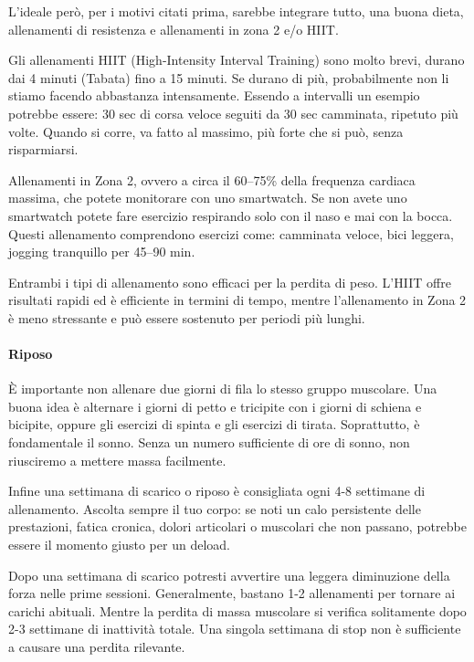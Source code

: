 \documentclass[12pt]{book} %
\begin{document}
L'ideale però, per i motivi citati prima, sarebbe integrare tutto, una buona dieta, allenamenti di resistenza e allenamenti in zona 2 e/o HIIT.

Gli allenamenti HIIT (High-Intensity Interval Training) sono molto brevi, durano dai 4 minuti (Tabata) fino a 15 minuti. Se durano di più, probabilmente non li stiamo facendo abbastanza intensamente.
Essendo a intervalli un esempio potrebbe essere: 30 sec di corsa veloce seguiti da 30 sec camminata, ripetuto più volte. Quando si corre, va fatto al massimo, più forte che si può, senza risparmiarsi.

Allenamenti in Zona 2, ovvero a circa il 60–75\% della frequenza cardiaca massima, che potete monitorare con uno smartwatch. Se non avete uno smartwatch potete fare esercizio respirando solo con il naso e mai con la bocca. Questi allenamento comprendono esercizi come: camminata veloce, bici leggera, jogging tranquillo per 45–90 min.

Entrambi i tipi di allenamento sono efficaci per la perdita di peso. L'HIIT offre risultati rapidi ed è efficiente in termini di tempo, mentre l'allenamento in Zona 2 è meno stressante e può essere sostenuto per periodi più lunghi.

\paragraph{Riposo}
È importante non allenare due giorni di fila lo stesso gruppo muscolare. Una buona idea è alternare i giorni di petto e tricipite con i giorni di schiena e bicipite, oppure gli esercizi di spinta e gli esercizi di tirata.
Soprattutto, è fondamentale il sonno. Senza un numero sufficiente di ore di sonno, non riusciremo a mettere massa facilmente.

Infine una settimana di scarico o riposo è consigliata ogni 4-8 settimane di allenamento. Ascolta sempre il tuo corpo: se noti un calo persistente delle prestazioni, fatica cronica, dolori articolari o muscolari che non passano, potrebbe essere il momento giusto per un deload. 

Dopo una settimana di scarico potresti avvertire una leggera diminuzione della forza nelle prime sessioni. Generalmente, bastano 1-2 allenamenti per tornare ai carichi abituali. Mentre la perdita di massa muscolare si verifica solitamente dopo 2-3 settimane di inattività totale. Una singola settimana di stop non è sufficiente a causare una perdita rilevante.
\end{document}
